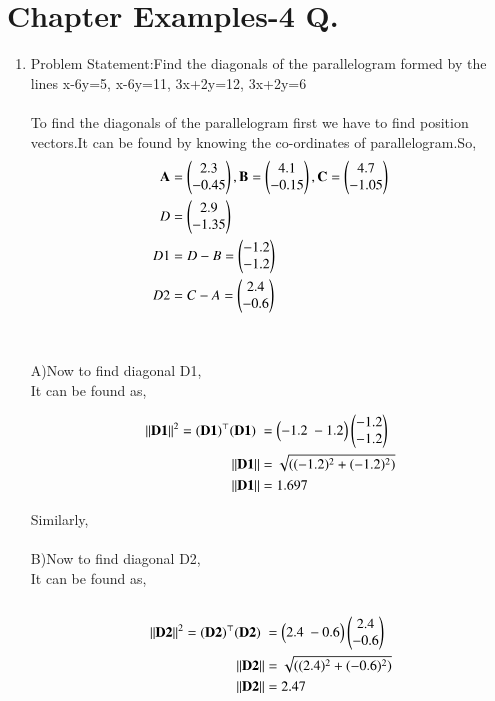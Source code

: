 \documentclass[journal,12pt,twocolumn]{IEEEtran}
\renewcommand\thesection{\arabic{section}}
\begin{document}
\section{ Chapter   Examples-4 Q. }
\renewcommand{\theequation}{\theenumi}
\begin{enumerate}[label=\thesection.\arabic*.,ref=\thesection.\theenumi]

\item Problem Statement:Find the diagonals of the parallelogram formed by the lines x-6y=5, x-6y=11, 3x+2y=12, 3x+2y=6\\
\\
\solution
To find the diagonals of the parallelogram first we have to find position vectors.It can be found by knowing the co-ordinates of parallelogram.So,  
\begin{align*}
    \mathbf{A} &= \begin{pmatrix}2.3\\-0.45\end{pmatrix}, \mathbf{B} = \begin{pmatrix}4.1\\-0.15\end{pmatrix},\mathbf{C}=\begin{pmatrix}4.7\\-1.05\end{pmatrix}\\D&=\begin{pmatrix}2.9\\-1.35\end{pmatrix}\\
    D1&=D-B=\begin{pmatrix}-1.2\\-1.2\end{pmatrix}\\
    D2&=C-A=\begin{pmatrix}2.4\\-0.6\end{pmatrix}
\end{align*}\\
\\
A)Now to find diagonal D1,\\ 
It can be found as,

\begin{align}
\lVert\mathbf{D1}\rVert^2= (\mathbf{D1})^\top (\mathbf{D1})\;
&=  \begin{pmatrix}-1.2 \ -1.2\end{pmatrix} \begin{pmatrix}-1.2\\-1.2\end{pmatrix}\\
\lVert\mathbf{D1}\rVert&=\sqrt{((-1.2)^2 + (-1.2)^2)}\\\nonumber
\lVert\mathbf{D1}\rVert&=1.697\\
\end{align}

Similarly,\\
\\
B)Now to find diagonal D2,\\
It can be found as,
\\
\\


\begin{align}
\lVert\mathbf{D2}\rVert^2= (\mathbf{D2})^\top (\mathbf{D2})\;
&=  \begin{pmatrix}2.4 \ -0.6\end{pmatrix} \begin{pmatrix}2.4\\-0.6\end{pmatrix}\\
\lVert\mathbf{D2}\rVert&=\sqrt{((2.4)^2 + (-0.6)^2)}\\\nonumber
\lVert\mathbf{D2}\rVert&=2.47\\
\end{align}


\end{enumerate}
\end{document}
